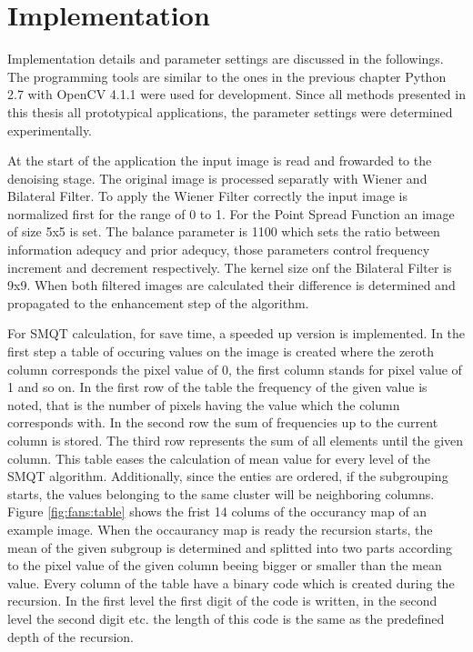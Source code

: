 \documentclass[draft,final]{vutinfth} %
\begin{document}
\section{Implementation}
\par
Implementation details and parameter settings are discussed  in the followings.
The programming tools are similar to the ones in the previous chapter Python 2.7 \cite{van1995python} with OpenCV 4.1.1 \cite{opencv_library} were used for development.
Since all methods presented in this thesis all prototypical applications, the parameter settings were determined experimentally.
\par
At the start of the application the input image is read and frowarded to the denoising stage.
The original image is processed separatly with Wiener and Bilateral Filter.
To apply the Wiener Filter correctly the input image is normalized first for the range of 0 to 1.
For the Point Spread Function an image of size 5x5 is set.
The balance parameter is 1100 which sets the ratio between information adequcy and prior adequcy, those parameters control frequency increment and decrement respectively.
The kernel size onf the Bilateral Filter is 9x9.
When both filtered images are calculated their difference is determined and propagated to the enhancement step of the algorithm.
\par
For SMQT calculation, for save time, a speeded up version is implemented.
In the first step a table of occuring values on the image is created where the zeroth column corresponds the pixel value of 0, the first column stands for pixel value of 1 and so on.
In the first row of the table the frequency of the given value is noted, that is the number of pixels having the value which the column corresponds with.
In the second row the sum of frequencies up to the current column is stored.
The third row represents the sum of all elements until the given column.
This table eases the calculation of mean value for every level of the SMQT algorithm.
Additionally, since the enties are ordered, if the subgrouping starts, the values belonging to the same cluster will be neighboring columns.
Figure \ref{fig:fans:table} shows the frist 14 colums of the occurancy map of an example image.
When the occaurancy map is ready the recursion starts, the mean of the given subgroup is determined and splitted into two parts according to the pixel value of the given column beeing bigger or smaller than the mean value. 
Every column of the table have a binary code which is created during the recursion.
In the first level the first digit of the code is written, in the second level the second digit etc. the length of this code is the same as the predefined depth of the recursion.
\end{document}
